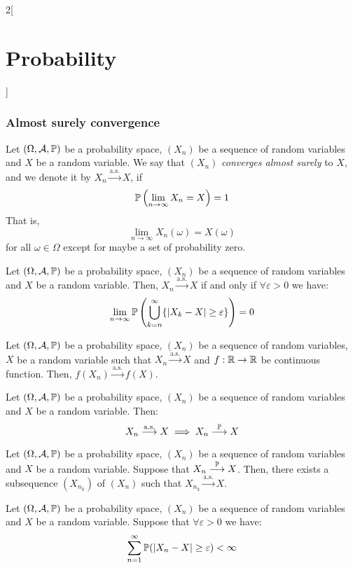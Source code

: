 \documentclass[../../../main.tex]{subfiles}
\begin{document}
\begin{multicols}{2}[\section{Probability}]
  \subsubsection{Almost surely convergence}
  \begin{definition}
    Let $(\Omega,\mathcal{A},\mathbb{P})$ be a probability space, $(X_n)$ be a sequence of random variables and $X$ be a random variable. We say that $(X_n)$ \textit{converges almost surely} to $X$, and we denote it by $X_n\overset{\text{a.s.}}{\longrightarrow} X$, if $$\mathbb{P}\left(\lim_{n\to\infty}X_n=X\right)=1$$ That is, $$\lim_{n\to\infty}X_n(\omega)=X(\omega)$$ for all $\omega\in\Omega$ except for maybe a set of probability zero.
  \end{definition}
  \begin{prop}
    Let $(\Omega,\mathcal{A},\mathbb{P})$ be a probability space, $(X_n)$ be a sequence of random variables and $X$ be a random variable. Then, $X_n\overset{\text{a.s.}}{\longrightarrow} X$ if and only if $\forall \varepsilon>0$ we have: $$\lim_{n\to\infty}\mathbb{P}\left(\bigcup_{k=n}^\infty\{|X_k-X|\geq\varepsilon\}\right)=0$$
  \end{prop}
  \begin{prop}
    Let $(\Omega,\mathcal{A},\mathbb{P})$ be a probability space, $(X_n)$ be a sequence of random variables, $X$ be a random variable such that $X_n\overset{\text{a.s.}}{\longrightarrow} X$ and $f:\mathbb{R}\rightarrow\mathbb{R}$ be continuous function. Then, $f(X_n)\overset{\text{a.s.}}{\longrightarrow} f(X)$.
  \end{prop}
  \begin{prop}
    Let $(\Omega,\mathcal{A},\mathbb{P})$ be a probability space, $(X_n)$ be a sequence of random variables and $X$ be a random variable. Then:
    $$X_n\overset{\text{a.s.}}{\longrightarrow} X\implies X_n\overset{\mathbb{P}}{\longrightarrow} X$$
  \end{prop}
  \begin{prop}
    Let $(\Omega,\mathcal{A},\mathbb{P})$ be a probability space, $(X_n)$ be a sequence of random variables and $X$ be a random variable. Suppose that $X_n\overset{\mathbb{P}}{\longrightarrow} X$. Then, there exists a subsequence $(X_{n_k})$ of $(X_n)$ such that $X_{n_k}\overset{\text{a.s.}}{\longrightarrow} X$.
  \end{prop}
  \begin{prop}
    Let $(\Omega,\mathcal{A},\mathbb{P})$ be a probability space, $(X_n)$ be a sequence of random variables and $X$ be a random variable. Suppose that $\forall\varepsilon >0$ we have: $$\sum_{n=1}^\infty\mathbb{P}(|X_n-X|\geq\varepsilon)<\infty$$

\end{prop}
\end{multicols}
\end{document}
